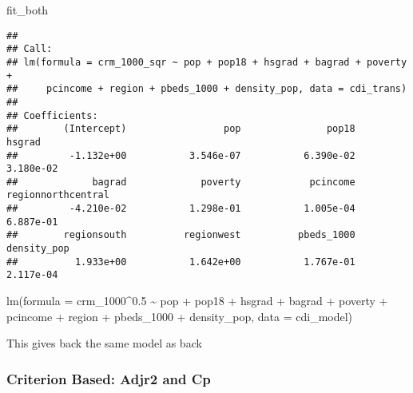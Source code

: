 \documentclass[
]{article}
\newenvironment{Shaded}{\begin{snugshade}}{\end{snugshade}}
\newcommand{\AttributeTok}[1]{\textcolor[rgb]{0.77,0.63,0.00}{#1}}
\newcommand{\CommentTok}[1]{\textcolor[rgb]{0.56,0.35,0.01}{\textit{#1}}}
\newcommand{\DecValTok}[1]{\textcolor[rgb]{0.00,0.00,0.81}{#1}}
\newcommand{\FunctionTok}[1]{\textcolor[rgb]{0.00,0.00,0.00}{#1}}
\newcommand{\NormalTok}[1]{#1}
\newcommand{\OtherTok}[1]{\textcolor[rgb]{0.56,0.35,0.01}{#1}}
\newcommand{\SpecialCharTok}[1]{\textcolor[rgb]{0.00,0.00,0.00}{#1}}
\newcommand{\StringTok}[1]{\textcolor[rgb]{0.31,0.60,0.02}{#1}}
\begin{document}
\begin{Shaded}
\begin{Highlighting}[]
\NormalTok{fit\_both}
\end{Highlighting}
\end{Shaded}

\begin{verbatim}
## 
## Call:
## lm(formula = crm_1000_sqr ~ pop + pop18 + hsgrad + bagrad + poverty + 
##     pcincome + region + pbeds_1000 + density_pop, data = cdi_trans)
## 
## Coefficients:
##        (Intercept)                 pop               pop18              hsgrad  
##         -1.132e+00           3.546e-07           6.390e-02           3.180e-02  
##             bagrad             poverty            pcincome  regionnorthcentral  
##         -4.210e-02           1.298e-01           1.005e-04           6.887e-01  
##        regionsouth          regionwest          pbeds_1000         density_pop  
##          1.933e+00           1.642e+00           1.767e-01           2.117e-04
\end{verbatim}

lm(formula = crm\_1000\^{}0.5 \textasciitilde{} pop + pop18 + hsgrad +
bagrad + poverty + pcincome + region + pbeds\_1000 + density\_pop, data
= cdi\_model)

This gives back the same model as back

\hypertarget{criterion-based-adjr2-and-cp}{%
\subsubsection{Criterion Based: Adjr2 and
Cp}\label{criterion-based-adjr2-and-cp}}

\begin{Shaded}
\end{Shaded}
\end{document}
